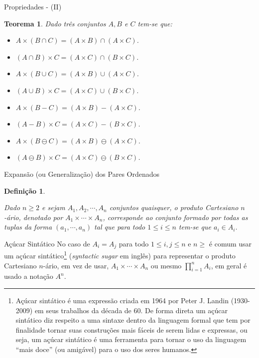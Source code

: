 \documentclass[aspectratio=169]{beamer}
\newtheorem{defi}{Definição}
\newtheorem{teo}{Teorema}
\begin{document}
	\begin{frame}{Propriedades - (II)}
		\begin{teo}
			Dado três conjuntos $A, B$ e $C$ tem-se que:
			\begin{itemize}
				\item[(i)] $A \times (B \cap C) = (A \times B) \cap (A \times C)$.
				\item[(ii)] $(A \cap B) \times C = (A \times C) \cap (B \times C)$.
				\item[(iii)] $A \times (B \cup C) = (A \times B) \cup (A \times C)$.
				\item[(iv)] $(A \cup B) \times C = (A \times C) \cup (B \times C)$.
				\item[(v)] $A \times (B - C) = (A \times B) - (A \times C)$.
				\item[(vi)] $(A - B) \times C = (A \times C) - (B \times C)$.
				\item[(vii)] $A \times (B \ominus C) = (A \times B) \ominus (A \times C)$.
				\item[(vii)] $(A \ominus B) \times C = (A \times C) \ominus (B \times C)$.
			\end{itemize}
		\end{teo}
	\end{frame}

	\begin{frame}{Expansão (ou Generalização) dos Pares Ordenados}
		\begin{defi}
			\
			
			Dado $n \geq 2$ e sejam $A_1, A_2, \cdots, A_n$ conjuntos quaisquer, o produto Cartesiano $n$-ário, denotado por $A_1 \times \cdots \times A_n$, corresponde ao conjunto formado por todas as tuplas da forma $(a_1, \cdots, a_n)$ tal que para todo $1 \leq i \leq n$ tem-se que $a_i \in A_i$.
		\end{defi}
		\pause
		\begin{alertblock}{Açúcar Sintático}
			No caso de $A_i = A_j$ para todo $1 \leq i, j \leq n$ e $n \geq$ é comum usar um açúcar sintático\footnote{Açúcar sintático é uma expressão criada em 1964 por Peter J. Landin (1930-2009) em seus trabalhos da década de 60. De forma direta um açúcar sintático diz respeito a uma sintaxe dentro da linguagem formal que tem por finalidade tornar suas construções mais fáceis de serem lidas e expressas, ou seja, um açúcar sintático é uma ferramenta para tornar o uso da linguagem ``mais doce'' (ou amigável) para o uso dos seres humanos.} (\textit{syntactic sugar} em inglês) para representar o produto Cartesiano $n$-ário, em vez de usar, $A_1 \times \cdots \times A_n$ ou mesmo $\displaystyle\prod_{i = 1}^{n} A_i$, em geral é usado a notação $A^n$.
		\end{alertblock}
	\end{frame}
\end{document}
